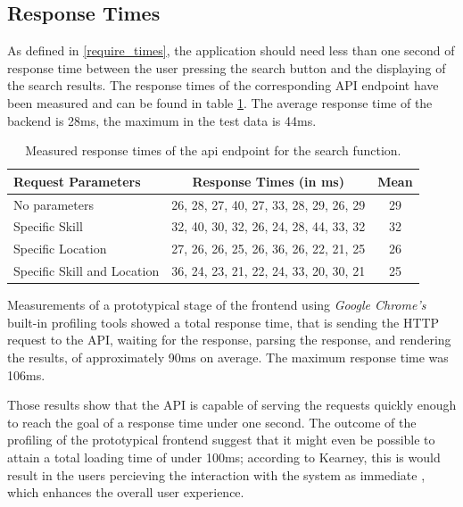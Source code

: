 \subsection{Response Times}
\label{resptime}
As defined in \ref{require_times}, the application should need less than one second of response time between the user pressing the search button and the
displaying of the search results. The response times of the corresponding API endpoint have been measured and can be found in table \ref{tab:responsetimes}.
The average response time of the backend is 28ms, the maximum in the test data is 44ms.

\begin{table}[H]
\centering
  \begin{tabular}{l|c|c|}
		Request Parameters                    & Response Times (in ms)                & Mean\\
		\hline
		No parameters               & 26, 28, 27, 40, 27, 33, 28, 29, 26, 29 & 29\\
		Specific Skill              & 32, 40, 30, 32, 26, 24, 28, 44, 33, 32 & 32\\
		Specific Location           & 27, 26, 26, 25, 26, 36, 26, 22, 21, 25 & 26\\
		Specific Skill and Location & 36, 24, 23, 21, 22, 24, 33, 20, 30, 21 & 25\\
  \end{tabular}

\caption[API Response Times]{Measured response times of the api endpoint for the search function.}
\label{tab:responsetimes}
\end{table}

Measurements of a prototypical stage of the frontend using \textit{Google Chrome's} built-in profiling tools showed a total response time, that is sending the HTTP request to the API, waiting for the response, parsing the response, and rendering the results, of approximately 90ms on average. The maximum response time was 106ms.

Those results show that the API is capable of serving the requests quickly enough to reach the goal of a response time under one second. The outcome of the profiling of the prototypical frontend suggest that it might even be possible to attain a total loading time of under 100ms; according to Kearney, this is would result in the users percieving the interaction with the system as immediate \cite{RAIL}, which enhances the overall user experience.

